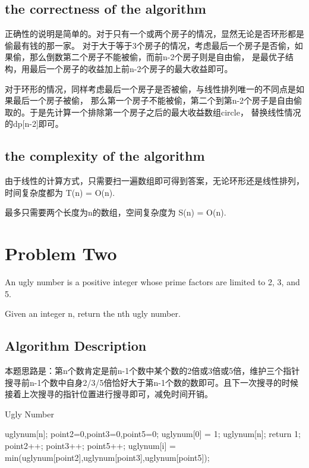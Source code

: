 \documentclass{article}
\begin{document}
\subsection{the correctness of the algorithm}
正确性的说明是简单的。对于只有一个或两个房子的情况，显然无论是否环形都是偷最有钱的那一家。
对于大于等于3个房子的情况，考虑最后一个房子是否偷，如果偷，那么倒数第二个房子不能被偷，而前n-2个房子则是自由偷，
是最优子结构，用最后一个房子的收益加上前n-2个房子的最大收益即可。


对于环形的情况，同样考虑最后一个房子是否被偷，与线性排列唯一的不同点是如果最后一个房子被偷，
那么第一个房子不能被偷，第二个到第n-2个房子是自由偷取的。于是先计算一个排除第一个房子之后的最大收益数组circle，
替换线性情况的dp[n-2]即可。
\subsection{the complexity of the algorithm}
由于线性的计算方式，只需要扫一遍数组即可得到答案，无论环形还是线性排列，时间复杂度都为 T(n) = O(n).


最多只需要两个长度为n的数组，空间复杂度为 S(n) = O(n).





\newpage
\section{Problem Two}
An ugly number is a positive integer whose prime factors are limited to 2, 3, and 5.


Given an integer n, return the nth ugly number.
\subsection{Algorithm Description}
本题思路是：第n个数肯定是前n-1个数中某个数的2倍或3倍或5倍，维护三个指针搜寻前n-1个数中自身2/3/5倍恰好大于第n-1个数的数即可。且下一次搜寻的时候接着上次搜寻的指针位置进行搜寻即可，减免时间开销。

\begin{algorithm}[htbp]  
  \caption{Ugly Number}  
  \begin{algorithmic}[1] 
   \State uglynum[n];
   \State point2=0,point3=0,point5=0;
   \State uglynum[0] = 1;
   \State uglynum[n];
	 \State return 1;
  \EndIf 
  \State point2++;
  \EndWhile 
  \State point3++;
  \EndWhile
  \State point5++;
  \EndWhile 
  \State uglynum[i] = min(uglynum[point2],uglynum[point3],uglynum[point5]);
  \EndFor
    \EndFunction  
  \end{algorithmic}  
\end{algorithm} 
\newpage
\end{document}
